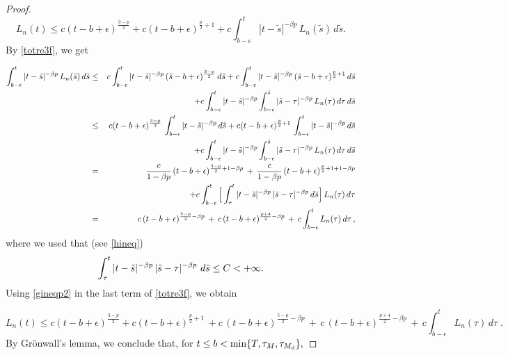 \documentclass[reqno]{amsart}
\numberwithin{equation}{section}
\begin{document}
\begin{proof}
\begin{equation}\label{totre3f} L_n(t) \leq c (t-b+\epsilon)^{\frac{3-p}{2}} + c (t-b+\epsilon)^{\frac{p}{2}+1} + c\int_{b-\epsilon}^t|t-\tilde{s}|^{-\beta p} \,L_n(\tilde{s})\,d\tilde{s}.\end{equation}
By \eqref{totre3f}, we get %

\begin{eqnarray}
\int_{b-\epsilon}^t|t-\tilde{s}|^{-\beta p}\, L_n(\tilde{s})\,d\tilde{s}
&\leq&
c \int_{b-\epsilon}^t |t-\Tilde{s}|^{-\beta p}\, (\tilde{s}-b+\epsilon)^{\frac{3-p}{2}}\,d\tilde{s} 
+ c \int_{b-\epsilon}^t |t-\Tilde{s}|^{-\beta p} \, (\tilde{s}-b+\epsilon)^{\frac{p}{2}+1}\,d\tilde{s} 
\nonumber\\
& & + c \int_{b-\epsilon}^t |t-\Tilde{s}|^{-\beta p} \int_{b-\epsilon}^{\tilde{s}} |\tilde{s}-\tau|^{-\beta p} \,  L_n(\tau) \, d\tau \, d\tilde{s}
\nonumber\\
&\leq&
c (t-b+\epsilon)^{\frac{3-p}{2}}\, \int_{b-\epsilon}^t |t-\Tilde{s}|^{-\beta p}\, d\tilde{s} 
+ c  (t-b+\epsilon)^{\frac{p}{2}+1}\,\int_{b-\epsilon}^t |t-\Tilde{s}|^{-\beta p} \,d\tilde{s} 
\nonumber\\
& & + c \int_{b-\epsilon}^t |t-\Tilde{s}|^{-\beta p} \int_{b-\epsilon}^{\tilde{s}}  |\tilde{s}-\tau|^{-\beta p} \, L_n(\tau) \, d\tau \, d\tilde{s}
\nonumber\\
&=&
\frac{c}{1-\beta p} \, (t-b+\epsilon)^{\frac{3-p}{2}+1-\beta p}
\,+\,
\frac{c}{1-\beta p} \, (t-b+\epsilon)^{\frac{p}{2}+1+1-\beta p}
\nonumber\\
& & + c \int_{b-\epsilon}^t \Big[ \int_{\tau}^t |t-\Tilde{s}|^{-\beta p} \, |\tilde{s}-\tau|^{-\beta p} \, d\tilde{s} \Big]\, L_n(\tau) \, d\tau
\nonumber\\
&=&
c\, (t-b+\epsilon)^{\frac{5-p}{2}-\beta p}
\,+\,
c \, (t-b+\epsilon)^{\frac{p+4}{2}-\beta p}
\, +\, c \int_{b-\epsilon}^t L_n(\tau) \, d\tau \,,\label{gineqp2}
\end{eqnarray}
where we used that (see \eqref{hineq})
$$
\int_\tau^t|t-\Tilde{s}|^{-\beta p} \, |\tilde{s}-\tau|^{-\beta p} \,  \,d\tilde{s} \leq C < +\infty.
$$
Using \eqref{gineqp2} in the last term of \eqref{totre3f}, we obtain

\begin{equation}
L_n(t) \leq c (t-b+\epsilon)^{\frac{3-p}{2}} + c (t-b+\epsilon)^{\frac{p}{2}+1}\,+ c\, (t-b+\epsilon)^{\frac{5-p}{2}-\beta p}
\,+\,c \, (t-b+\epsilon)^{\frac{p+4}{2}-\beta p}
\, +\, c \int_{b-\epsilon}^t L_n(\tau) \, d\tau\;.
\end{equation}
By Gr\"onwall's lemma, we conclude that, for $t\leq b < \min\{T,\tau_M,\tau_{M_{\rm d}}\}, $


\end{proof}
\end{document}
